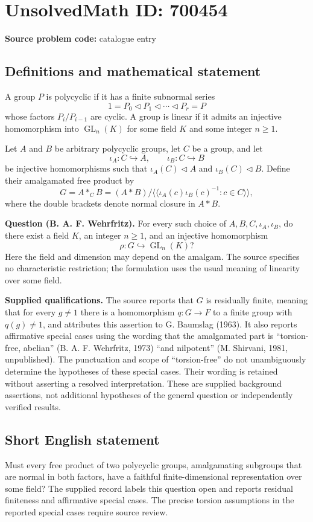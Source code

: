 \documentclass[11pt]{article}
\begin{document}
\section*{UnsolvedMath ID: 700454}
\textbf{Source problem code:} catalogue entry
\subsection{Definitions and mathematical statement}
A group \(P\) is polycyclic if it has a finite subnormal series
\[
1=P_0\triangleleft P_1\triangleleft\cdots\triangleleft P_r=P
\]
whose factors \(P_i/P_{i-1}\) are cyclic. A group is linear if it admits an injective homomorphism into \(\operatorname{GL}_n(K)\) for some field \(K\) and some integer \(n\geq 1\).

Let \(A\) and \(B\) be arbitrary polycyclic groups, let \(C\) be a group, and let
\[
\iota_A:C\hookrightarrow A,\qquad \iota_B:C\hookrightarrow B
\]
be injective homomorphisms such that \(\iota_A(C)\triangleleft A\) and \(\iota_B(C)\triangleleft B\). Define their amalgamated free product by
\[
G=A\mathbin{*_{C}}B
=(A*B)\big/\big\langle\!\big\langle
\iota_A(c)\iota_B(c)^{-1}:c\in C
\big\rangle\!\big\rangle,
\]
where the double brackets denote normal closure in \(A*B\).

\textbf{Question (B. A. F. Wehrfritz).} For every such choice of \(A,B,C,\iota_A,\iota_B\), do there exist a field \(K\), an integer \(n\geq 1\), and an injective homomorphism
\[
\rho:G\hookrightarrow\operatorname{GL}_n(K)?
\]
Here the field and dimension may depend on the amalgam. The source specifies no characteristic restriction; the formulation uses the usual meaning of linearity over some field.

\textbf{Supplied qualifications.} The source reports that \(G\) is residually finite, meaning that for every \(g\neq 1\) there is a homomorphism \(q:G\to F\) to a finite group with \(q(g)\neq 1\), and attributes this assertion to G. Baumslag (1963). It also reports affirmative special cases using the wording that the amalgamated part is ``torsion-free, abelian'' (B. A. F. Wehrfritz, 1973) ``and nilpotent'' (M. Shirvani, 1981, unpublished). The punctuation and scope of ``torsion-free'' do not unambiguously determine the hypotheses of these special cases. Their wording is retained without asserting a resolved interpretation. These are supplied background assertions, not additional hypotheses of the general question or independently verified results.
\subsection{Short English statement}
Must every free product of two polycyclic groups, amalgamating subgroups that are normal in both factors, have a faithful finite-dimensional representation over some field? The supplied record labels this question open and reports residual finiteness and affirmative special cases. The precise torsion assumptions in the reported special cases require source review.
\end{document}
